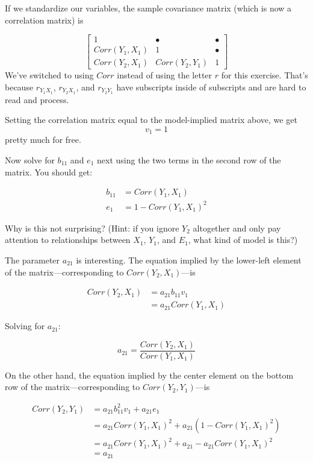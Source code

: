 \documentclass[
]{book}
\begin{document}
If we standardize our variables, the sample covariance matrix (which is now a correlation matrix) is

\[
\begin{bmatrix}
1                   &   \bullet             &   \bullet \\
Corr(Y_{1}, X_{1})  &   1                   &   \bullet \\
Corr(Y_{2}, X_{1})  &   Corr(Y_{2}, Y_{1})   &   1
\end{bmatrix}
\]
We've switched to using \(Corr\) instead of using the letter \(r\) for this exercise. That's because \(r_{Y_{1}X_{1}}\), \(r_{Y_{2}X_{1}}\), and \(r_{Y_{2}Y_{1}}\) have subscripts inside of subscripts and are hard to read and process.

Setting the correlation matrix equal to the model-implied matrix above, we get
\[
v_{1} = 1
\]
pretty much for free.

Now solve for \(b_{11}\) and \(e_{1}\) next using the two terms in the second row of the matrix. You should get:

\begin{align}
b_{11}  &= Corr(Y_{1}, X_{1})       \\
e_{1}   &= 1 - Corr(Y_{1}, X_{1})^{2}
\end{align}

Why is this not surprising? (Hint: if you ignore \(Y_{2}\) altogether and only pay attention to relationships between \(X_{1}\), \(Y_{1}\), and \(E_{1}\), what kind of model is this?)

The parameter \(a_{21}\) is interesting. The equation implied by the lower-left element of the matrix---corresponding to \(Corr(Y_{2}, X_{1})\)---is

\begin{align}
Corr(Y_{2}, X_{1})  &= a_{21}b_{11}v_{1}        \\
                    &= a_{21}Corr(Y_{1}, X_{1})
\end{align}

Solving for \(a_{21}\):

\[
a_{21} = \frac{Corr(Y_{2}, X_{1})}{Corr(Y_{1}, X_{1})}
\]

On the other hand, the equation implied by the center element on the bottom row of the matrix---corresponding to \(Corr(Y_{2}, Y_{1})\)---is

\begin{align}
Corr(Y_{2}, Y_{1})
    &= a_{21}b_{11}^{2}v_{1} + a_{21}e_{1}  \\
    &= a_{21}Corr(Y_{1}, X_{1})^{2} + 
        a_{21}\left( 1 - Corr(Y_{1}, X_{1})^{2} \right) \\
    &= a_{21}Corr(Y_{1}, X_{1})^{2} +
        a_{21} - a_{21}Corr(Y_{1}, X_{1})^{2}       \\
    &= a_{21}
\end{align}
\end{document}
